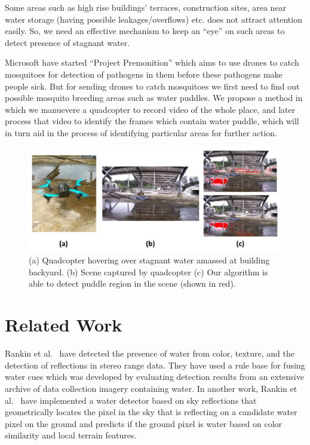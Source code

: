 \documentclass[times,10pt,twocolumn,letterpaper]{article}
\begin{document}
Some areas such as high rise buildings' terraces, construction sites, area
near water storage (having possible leakages/overflows) etc. does not attract
attention easily. So, we need an effective mechanism to keep an ``eye'' on such
areas to detect presence of stagnant water. 

Microsoft \cite{Microsoft15} have started ``Project Premonition'' which aims to
use drones to catch mosquitoes for detection of pathogens in them before these
pathogens make people sick. But for sending drones to catch mosquitoes we first
need to find out possible mosquito breeding areas such as water puddles. We
propose a method in which we manuevere a quadcopter to record video of the
whole place, and later process that video to identify the frames which contain
water puddle, which will in turn aid in the process of identifying particular
areas for further action.

\begin{figure}[h!]
\centering
\includegraphics[width=\linewidth]{images/teaser.pdf}
\caption{(a) Quadcopter hovering over stagnant water amassed at building
backyard. (b) Scene captured by quadcopter (c) Our algorithm is able to detect
puddle region in the scene (shown in red).}
\end{figure}

\section{Related Work}

Rankin et al.~\cite{rankin04} have detected the presence of water from color,
texture, and the detection of reflections in stereo range data. They have used a
rule base for fusing water cues which was developed by evaluating detection
results from an extensive archive of data collection imagery containing water.
In another work, Rankin et al.~\cite{rankin11} have implemented a water detector
based on sky reflections that geometrically locates the pixel in the sky that
is reflecting on a candidate water pixel on the ground and predicts if the
ground pixel is water based on color similarity and local terrain features. 
\end{document}
